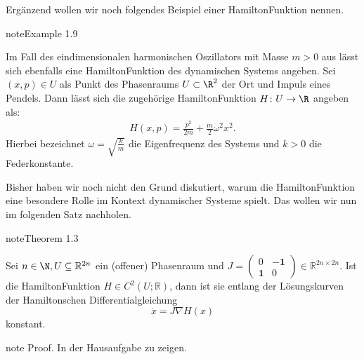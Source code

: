 \documentclass[letterpaper,10pt,english]{jupyterBook}
\begin{document}
\sphinxAtStartPar
Ergänzend wollen wir noch folgendes Beispiel einer Hamilton\sphinxhyphen{}Funktion nennen.
\label{ode/hamilton:example-4}
\begin{sphinxadmonition}{note}{Example 1.9}



\sphinxAtStartPar
Im Fall des eindimensionalen harmonischen Oszillators mit Masse \(m > 0\) aus {\hyperref[\detokenize{ode/fluesse:ex:oscillations}]{}} lässt sich ebenfalls eine Hamilton\sphinxhyphen{}Funktion des dynamischen Systems angeben.
Sei \((x,p) \in U\) als Punkt des Phasenraums \(U \subset \R^2\) der Ort und Impuls eines Pendels.
Dann lässt sich die zugehörige Hamilton\sphinxhyphen{}Funktion \(H \colon U \rightarrow \R\) angeben als:
\begin{equation*}
\begin{split}H(x,p) = \frac{p^2}{2m} + \frac{m}{2} \omega^2 x^2.\end{split}
\end{equation*}
\sphinxAtStartPar
Hierbei bezeichnet \(\omega = \sqrt{\frac{k}{m}}\) die Eigenfrequenz des Systems und \(k > 0\) die Federkonstante.
\end{sphinxadmonition}

\sphinxAtStartPar
Bisher haben wir noch nicht den Grund diskutiert, warum die Hamilton\sphinxhyphen{}Funktion eine besondere Rolle im Kontext dynamischer Systeme spielt.
Das wollen wir nun im folgenden Satz nachholen.
\label{ode/hamilton:satz:hamilton_konstant}
\begin{sphinxadmonition}{note}{Theorem 1.3}



\sphinxAtStartPar
Sei \(n\in \N, U \subseteq \mathbb{R}^{2n}\) ein (offener) Phasenraum und \(J= \begin{pmatrix} 0 & - \mathbf{1} \\ \mathbf{1} & 0 \end{pmatrix} \in \mathbb{R}^{2n \times 2n}\).
Ist die Hamilton\sphinxhyphen{}Funktion \(H \in C^2(U; \mathbb{R})\), dann ist sie entlang der Lösungskurven der Hamiltonschen Differentialgleichung
\begin{equation*}
\dot x = J \nabla H(x)
\end{equation*}
\sphinxAtStartPar
konstant.
\end{sphinxadmonition}

\begin{sphinxadmonition}{note}
\sphinxAtStartPar
Proof. In der Hausaufgabe zu zeigen.
\end{sphinxadmonition}
\end{document}
